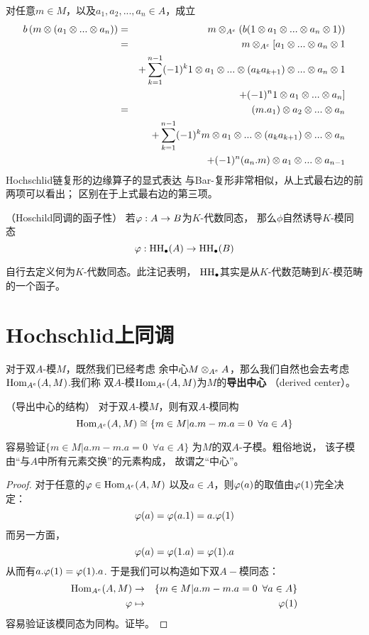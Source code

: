 对任意$m\in M$，以及$a_1,a_2,...,a_n\in A$，成立
\begin{eqnarray*}
    b\left(m\otimes (a_1\otimes...\otimes a_n)\right)
&=& m\otimes_{A^e}
      \left(
        b(1\otimes a_1\otimes...\otimes a_n\otimes 1)
      \right)\\
&=& m\otimes_{A^e}
      \large[
        a_1\otimes...\otimes a_n\otimes 1
      \\
&&+  \sum_{k=1}^{n-1}(-1)^k
           1\otimes a_1\otimes...\otimes(a_ka_{k+1})\otimes...\otimes a_n\otimes 1\\
&&+
        (-1)^n1\otimes a_1\otimes...\otimes a_n
    \large]\\
&=& (m.a_1)\otimes a_2\otimes...\otimes a_n\\
&&+ \sum_{k=1}^{n-1}(-1)^k
      m\otimes a_1\otimes...\otimes(a_ka_{k+1})\otimes...\otimes a_n\\
&&+ (-1)^n(a_n.m)\otimes a_1\otimes...\otimes a_{n-1}
\end{eqnarray*}
Hochschlid链复形的边缘算子的显式表达
与Bar-复形非常相似，从上式最右边的前两项可以看出；
区别在于上式最右边的第三项。\vs

\begin{rem}（Hoschild同调的函子性）
若$\varphi:A\to B$为$K$-代数同态，
那么$\phi$自然诱导$K$-模同态
$$\varphi:\operatorname{HH}_{\bullet}(A)\to \operatorname{HH}_{\bullet}(B)$$
\end{rem}
自行去定义何为$K$-代数同态。此注记表明，
$\operatorname{HH}_{\bullet}$其实是从$K$-代数范畴到$K$-模范畴的一个函子。

\section{Hochschlid上同调}

对于双$A$-模$M$，既然我们已经考虑
余中心$M\otimes_{A^e}A$，那么我们自然也会去考虑
$\operatorname{Hom}_{A^e}(A,M)$.我们称
双$A$-模$\operatorname{Hom}_{A^e}(A,M)$为$M$的\textbf{导出中心}
（derived center）。

\begin{prop}（导出中心的结构）
\label{双模的导出中心的结构prop}
对于双$A$-模$M$，则有双$A$-模同构
$$\operatorname{Hom}_{A^e}(A,M)
\cong\{m\in M|a.m-m.a=0\,\,\,\forall a\in A\}$$
\end{prop}

容易验证$\{m\in M|a.m-m.a=0\,\,\,\forall a\in A\}$
为$M$的双$A$-子模。粗俗地说，
该子模由“与$A$中所有元素交换”的元素构成，
故谓之“中心”。

\begin{proof}对于任意的$\varphi\in\operatorname{Hom}_{A^e}(A,M)$
以及$a\in A$，则$\varphi(a)$的取值由$\varphi(1)$完全决定：
$$\varphi(a)=\varphi(a.1)=a.\varphi(1)$$
而另一方面，
$$\varphi(a)=\varphi(1.a)=\varphi(1).a$$
从而有$a.\varphi(1)=\varphi(1).a$.
于是我们可以构造如下双$A-$模同态：
\begin{eqnarray*}
\operatorname{Hom}_{A^e}(A,M)
&\to&\{m\in M|a.m-m.a=0\,\,\,\forall a\in A\}\\
\varphi&\mapsto&\varphi(1)
\end{eqnarray*}
容易验证该模同态为同构。证毕。
\end{proof}

